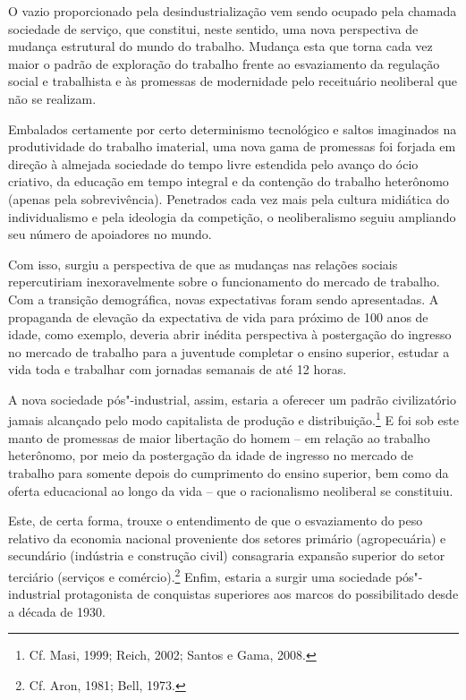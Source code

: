 O vazio proporcionado pela desindustrialização vem sendo ocupado pela
chamada sociedade de serviço, que constitui, neste sentido, uma nova
perspectiva de mudança estrutural do mundo do trabalho. Mudança esta que
torna cada vez maior o padrão de exploração do trabalho frente ao
esvaziamento da regulação social e trabalhista e às promessas de
modernidade pelo receituário neoliberal que não se realizam.

Embalados certamente por certo determinismo tecnológico e saltos
imaginados na produtividade do trabalho imaterial, uma nova gama de
promessas foi forjada em direção à almejada sociedade do tempo livre
estendida pelo avanço do ócio criativo, da educação em tempo integral e da
contenção do trabalho heterônomo (apenas pela sobrevivência). Penetrados
cada vez mais pela cultura midiática do individualismo e pela ideologia
da competição, o neoliberalismo seguiu ampliando seu número de
apoiadores no mundo.

Com isso, surgiu a perspectiva de que as mudanças nas relações sociais
repercutiriam inexoravelmente sobre o funcionamento do mercado de
trabalho. Com a transição demográfica, novas expectativas foram sendo
apresentadas. A propaganda de elevação da expectativa de vida para
próximo de 100 anos de idade, como exemplo, deveria abrir inédita
perspectiva à postergação do ingresso no mercado de trabalho para a
juventude completar o ensino superior, estudar a vida toda e trabalhar
com jornadas semanais de até 12 horas.

A nova sociedade pós"-industrial, assim, estaria a oferecer um padrão
civilizatório jamais alcançado pelo modo capitalista de produção e
distribuição.\footnote{Cf. Masi, 1999; Reich, 2002; Santos e Gama, 2008.} E foi sob este
manto de promessas de maior libertação do homem -- em relação ao
trabalho heterônomo, por meio da postergação da idade de
ingresso no mercado de trabalho para somente depois do cumprimento do
ensino superior, bem como da oferta educacional ao longo da vida -- que o
racionalismo neoliberal se constituiu.

Este, de certa forma, trouxe o entendimento de que o esvaziamento do peso
relativo da economia nacional proveniente dos setores primário
(agropecuária) e secundário (indústria e construção civil) consagraria
expansão superior do setor terciário (serviços e comércio).\footnote{Cf. Aron, 1981;
Bell, 1973.} Enfim, estaria a surgir uma sociedade pós"-industrial
protagonista de conquistas superiores aos marcos do possibilitado desde
a década de 1930.


